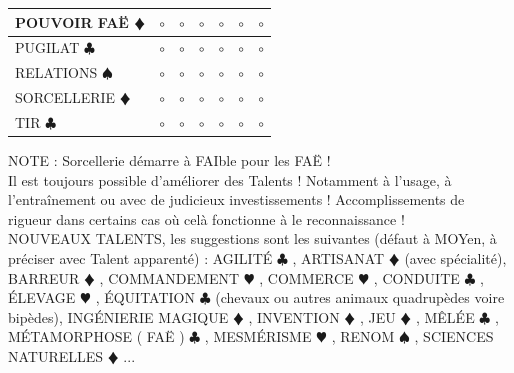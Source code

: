 \documentclass[a5paper,pagesize,french]{book}
\begin{document}
\begin{tabular}[c]{|p{}|p{}|p{}|p{}|p{}|p{}|p{}|}
	POUVOIR FAË {\color{red} $\vardiamond$ }			&	$\circ$	&	$\circ$	&	$\circ$	&	$\circ$	&	$\circ$		&	$\circ$		\\ \hline
	PUGILAT { $\clubsuit$ }								&	$\circ$	&	$\circ$	&	$\circ$	&	$\circ$	&	$\circ$		&	$\circ$		\\ \hline
	RELATIONS { $\spadesuit$ }							&	$\circ$	&	$\circ$	&	$\circ$	&	$\circ$	&	$\circ$		&	$\circ$		\\ \hline
	SORCELLERIE {\color{red} $\vardiamond$ }			&	$\circ$	&	$\circ$	&	$\circ$	&	$\circ$	&	$\circ$		&	$\circ$		\\ \hline
	TIR { $\clubsuit$ }									&	$\circ$	&	$\circ$	&	$\circ$	&	$\circ$	&	$\circ$		&	$\circ$		\\ \hline
\end{tabular}

NOTE : Sorcellerie démarre à FAIble pour les FAË !~\\

{ \setmainfont{Z003} Il est toujours possible d'améliorer des Talents ! Notamment à l'usage, à l'entraînement ou avec de judicieux investissements ! Accomplissements de rigueur dans certains cas où celà fonctionne à le reconnaissance ! }~\\

NOUVEAUX TALENTS, les suggestions sont les suivantes (défaut à MOYen, à préciser avec Talent apparenté) : AGILITÉ { $\clubsuit$ }, ARTISANAT {\color{red} $\vardiamond$ } (avec spécialité), BARREUR {\color{red} $\vardiamond$ }, COMMANDEMENT {\color{red} $\varheart$ }, COMMERCE {\color{red} $\varheart$ }, CONDUITE { $\clubsuit$ }, ÉLEVAGE {\color{red} $\varheart$ }, ÉQUITATION { $\clubsuit$ } (chevaux ou autres animaux quadrupèdes voire bipèdes), INGÉNIERIE MAGIQUE {\color{red} $\vardiamond$ }, INVENTION {\color{red} $\vardiamond$ }, JEU {\color{red} $\vardiamond$ }, MÊLÉE { $\clubsuit$ }, MÉTAMORPHOSE ( FAË ) { $\clubsuit$ }, MESMÉRISME {\color{red} $\varheart$ }, RENOM { $\spadesuit$ }, SCIENCES NATURELLES {\color{red} $\vardiamond$ }...~\\

\clearpage
\end{document}

